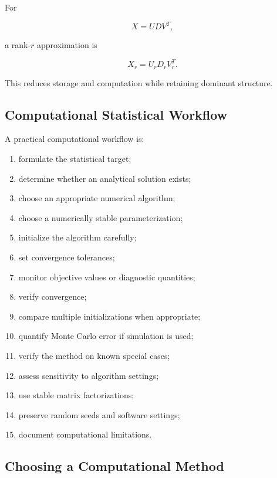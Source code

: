 For

\[
X
=
UDV^T,
\]

a rank-\(r\) approximation is

\[
\boxed{
X_r
=
U_r
D_r
V_r^T.
}
\]

This reduces storage and computation while retaining dominant structure.

\subsection{Computational Statistical Workflow}
\label{subsec:computational-statistics-workflow}

A practical computational workflow is:

\begin{enumerate}
    \item formulate the statistical target;
    \item determine whether an analytical solution exists;
    \item choose an appropriate numerical algorithm;
    \item choose a numerically stable parameterization;
    \item initialize the algorithm carefully;
    \item set convergence tolerances;
    \item monitor objective values or diagnostic quantities;
    \item verify convergence;
    \item compare multiple initializations when appropriate;
    \item quantify Monte Carlo error if simulation is used;
    \item verify the method on known special cases;
    \item assess sensitivity to algorithm settings;
    \item use stable matrix factorizations;
    \item preserve random seeds and software settings;
    \item document computational limitations.
\end{enumerate}

\subsection{Choosing a Computational Method}
\label{subsec:choosing-computational-method}

